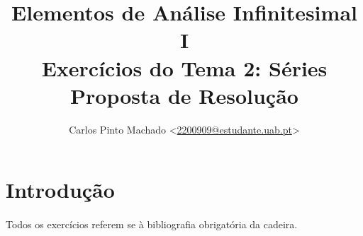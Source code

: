 \documentclass[11pt, a4paper]{article}
\title{
	Elementos de Análise Infinitesimal I\\
	Exercícios do Tema 2: Séries\\
	Proposta de Resolução
}
\author{
	Carlos Pinto Machado
	<\href{mailto:2200909@estudante.uab.pt}{2200909@estudante.uab.pt}>
}
\begin{document}
\maketitle
\tableofcontents

\clearpage

\section*{Introdução}
{}

\paragraph{} Todos os exercícios referem se à bibliografia obrigatória da
cadeira\parencite{Santos2016}.


\clearpage

\clearpage


\clearpage

\printbibliography[title={Bibliografia},heading=bibintoc]
\end{document}
